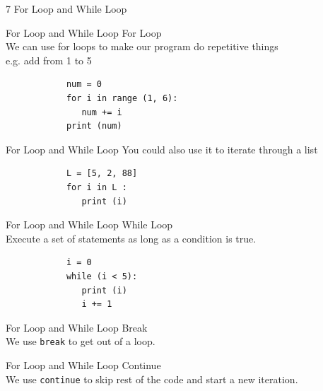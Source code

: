 \documentclass{beamer}
\begin{document}
    \begin{frame}[plain, c]
        \begin{center}
            \color{blue} \LARGE 7 For Loop and While Loop
        \end{center}
    \end{frame}
    
    \begin{frame}[fragile]{For Loop and While Loop}
        \color{blue} \Large For Loop \\
        \color{black} \normalsize \vskip 5pt
        We can use for loops to make our program do repetitive things \\
        e.g. add from 1 to 5 \\
        \begin{verbatim}
            num = 0
            for i in range (1, 6):
               num += i
            print (num)
        \end{verbatim}
    \end{frame}
    
    \begin{frame}[fragile]{For Loop and While Loop}
        You could also use it to iterate through a list
        \begin{verbatim}
            L = [5, 2, 88]
            for i in L :
               print (i)
        \end{verbatim}
    \end{frame}
    
    \begin{frame}[fragile]{For Loop and While Loop}
        \color{blue} \Large While Loop \\
        \color{black} \normalsize \vskip 5pt
        Execute a set of statements as long as a condition is true.\\
        \begin{verbatim}
            i = 0
            while (i < 5):
               print (i)
               i += 1
        \end{verbatim}
    \end{frame}
    
    \begin{frame}{For Loop and While Loop}
        \color{blue} \Large Break \\
        \color{black} \normalsize \vskip 5pt
        We use \texttt{break} to get out of a loop. \\
    \end{frame}
    
    \begin{frame}{For Loop and While Loop}
        \color{blue} \Large Continue \\
        \color{black} \normalsize \vskip 5pt
        We use \texttt{continue} to skip rest of the code and start a new iteration. \\
    \end{frame}
\end{document}
